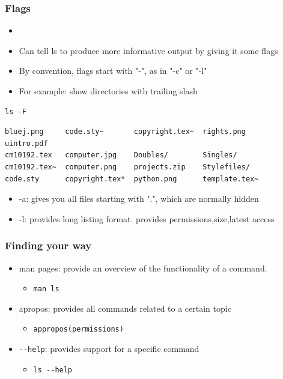 \begin{frame}[fragile]\frametitle{Flags}
\begin{itemize}
\item {}
\item Can tell ls to produce more informative output by giving it some flags
\item By convention, flags start with "-", as in "-c" or "-l"
\item For example: show directories with trailing slash
\end{itemize}
\codelist
\begin{lstlisting}
ls -F
\end{lstlisting}
\reslist
\codesmall
\begin{lstlisting}
bluej.png     code.sty~       copyright.tex~  rights.png     uintro.pdf
cm10192.tex   computer.jpg    Doubles/        Singles/
cm10192.tex~  computer.png    projects.zip    Stylefiles/
code.sty      copyright.tex*  python.png      template.tex~
\end{lstlisting}
\begin{itemize}
\item -a: gives you all files starting with ".", which are normally hidden
\item -l: provides long listing format. provides permissions,size,latest access
\end{itemize}
\end{frame}

\begin{frame}[fragile]\frametitle{Finding your way}
\begin{itemize}
\item man pages: provide an overview of the functionality of a command.
\begin{itemize}
\item \lstinline!man ls!
\end{itemize}
\end{itemize}
\begin{itemize}
\item apropos: provides all commands related to a certain topic
\begin{itemize}
\item \lstinline!appropos(permissions)!
\end{itemize}
\end{itemize}
\begin{itemize}
\item \lstinline!--help!: provides support for a specific command
\begin{itemize}
\item \lstinline!ls --help!
\end{itemize}
\end{itemize}
\end{frame}

